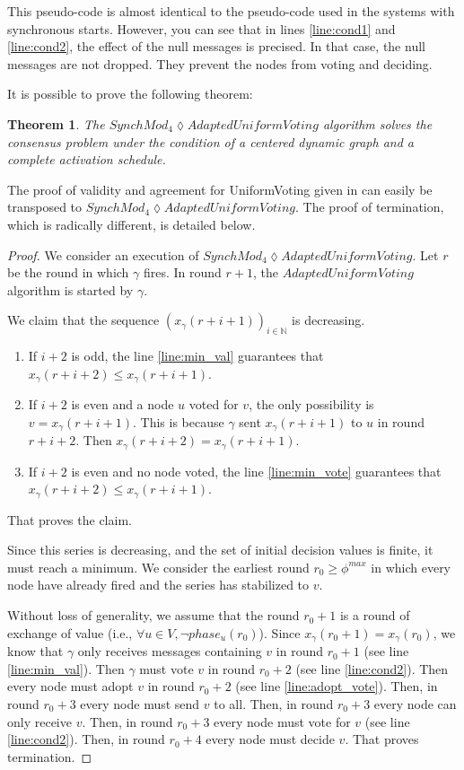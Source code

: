 \documentclass[11pt,letterpaper]{article}
\newtheorem{thm}{Theorem}
\newcommand{\cent}{\gamma}
\begin{document}
This pseudo-code is almost identical to the pseudo-code used in the systems with synchronous starts.
However, you can see that in lines \ref{line:cond1} and \ref{line:cond2}, the effect of the null messages is precised.
In that case, the null messages are not dropped. They prevent the nodes from voting and deciding.

It is possible to prove the following theorem:

\begin{thm}
	The $SynchMod_4 \lozenge AdaptedUniformVoting$ algorithm solves the consensus problem under the condition of a centered dynamic graph and a complete activation schedule.
\end{thm}

The proof of validity and agreement for UniformVoting given in \cite{CBS09} can easily be transposed to \newline $SynchMod_4 \lozenge AdaptedUniformVoting$.
The proof of termination, which is radically different, is detailed below.

\begin{proof}
	We consider an execution of $SynchMod_4 \lozenge AdaptedUniformVoting$.
	Let $r$ be the round in which $\cent$ fires.
	In round $r+1$, the $AdaptedUniformVoting$ algorithm is started by $\cent$.

	We claim that the sequence $(x_\cent(r+i+1))_{i \in \mathds{N}}$ is decreasing.
	\begin{enumerate}
		\item If $i+2$ is odd, the line \ref{line:min_val} guarantees that $x_\cent(r+i+2) \leq x_\cent(r+i+1)$.
		\item If $i+2$ is even and a node $u$ voted for $v$, the only possibility is $v = x_\cent(r+i+1)$. This is because $\cent$ sent $x_\cent(r+i+1)$ to $u$ in round $r+i+2$.
			Then $x_\cent(r+i+2) = x_\cent(r+i+1)$.
		\item If $i+2$ is even and no node voted, the line \ref{line:min_vote} guarantees that $x_\cent(r+i+2) \leq x_\cent(r+i+1)$.
	\end{enumerate}
	That proves the claim.

	Since this series is decreasing, and the set of initial decision values is finite, it must reach a minimum.
	We consider the earliest round $r_0 \geq \phi^{max}$ in which every node have already fired and the series has stabilized to $v$.

	Without loss of generality, we assume that the round $r_0+1$ is a round of exchange of value (i.e., $\forall u \in V, \neg phase_u(r_0)$).
	Since $x_\cent(r_0+1) = x_\cent(r_0)$, we know that $\cent$ only receives messages containing $v$ in round $r_0+1$ (see line \ref{line:min_val}).
	Then $\cent$ must vote $v$ in round $r_0+2$ (see line \ref{line:cond2}).
	Then every node must adopt $v$ in round $r_0+2$ (see line \ref{line:adopt_vote}).
	Then, in round $r_0+3$ every node must send $v$ to all.
	Then, in round $r_0+3$ every node can only receive $v$.
	Then, in round $r_0+3$ every node must vote for $v$ (see line \ref{line:cond2}).
	Then, in round $r_0+4$ every node must decide $v$.
	That proves termination.
\end{proof}
\end{document}
